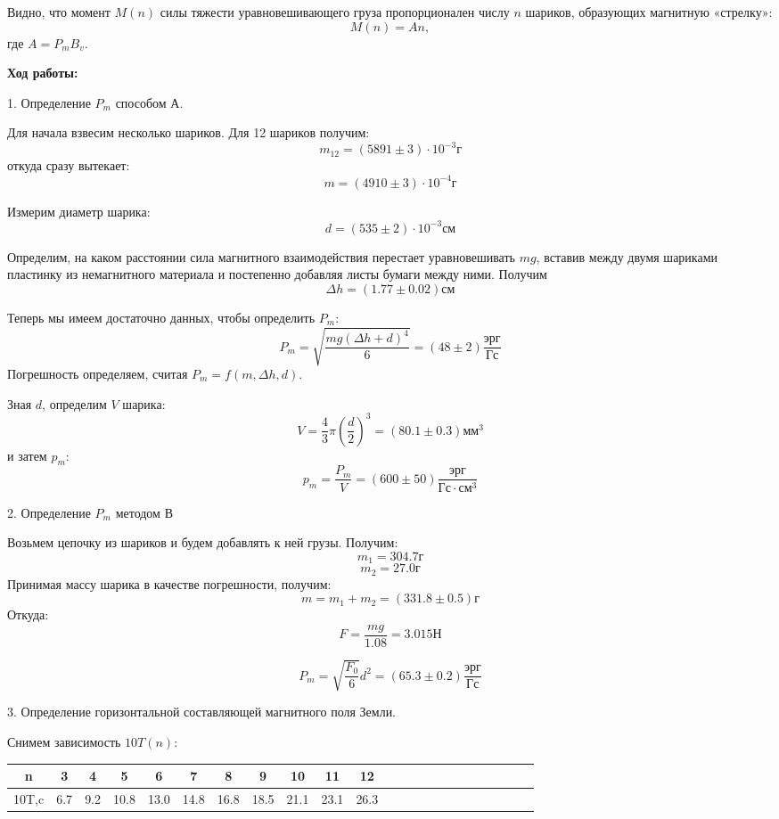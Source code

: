 \documentclass[14pt]{article}
\begin{document}
Видно, что момент $M(n)$ силы тяжести уравновешивающего груза пропорционален числу $n$ шариков, образующих магнитную «стрелку»:
$$
	M(n) = An,
$$
где $A = P_mB_v$.



\newpage
\textbf{Ход работы:}

1. Определение $P_m$ способом А.

Для начала взвесим несколько шариков. Для 12 шариков получим:
$$
	m_{12} = (5891 \pm 3)\cdot10^{-3} \text{г}
$$
откуда сразу вытекает:
$$
	m = (4910 \pm 3)\cdot10^{-4} \text{г}
$$

Измерим диаметр шарика:
$$
	d = (535 \pm 2)\cdot10^{-3} \text{см}
$$

Определим, на каком расстоянии сила магнитного взаимодействия перестает уравновешивать $mg$, вставив между двумя шариками пластинку из немагнитного материала и постепенно добавляя листы бумаги между ними. Получим
$$
	\Delta h = (1.77 \pm 0.02) \text{см}
$$

Теперь мы имеем достаточно данных, чтобы определить $P_m$:
$$
	P_m = \sqrt{\frac{mg(\Delta h + d)^4}{6}} = (48 \pm 2) \frac{\text{эрг}}{\text{Гс}}
$$
Погрешность определяем, считая $P_m = f(m, \Delta h, d)$.

Зная $d$, определим $V$ шарика:
$$
	V = \frac{4}{3}\pi\left(\frac{d}{2}\right)^3 = (80.1 \pm 0.3) \text{мм}^3
$$
и затем $p_m$:
$$
	p_m = \frac{P_m}{V} = (600 \pm 50) \frac{\text{эрг}}{\text{Гс}\cdot\text{см}^3}
$$


2. Определение $P_m$ методом В

Возьмем цепочку из шариков и будем добавлять к ней грузы. Получим:
$$
	m_1 = 304.7 \text{г}
$$
$$
	m_2 = 27.0 \text{г}
$$
Принимая массу шарика в качестве погрешности, получим:
$$
	m = m_1 + m_2 = (331.8 \pm 0.5) \text{г}
$$
Откуда:
$$
	F = \frac{mg}{1.08} = 3.015 \text{Н}
$$

$$
	P_m = \sqrt{\frac{F_0}{6}}d^2 = (65.3 \pm 0.2) \frac{\text{эрг}}{\text{Гс}}
$$

3. Определение горизонтальной составляющей магнитного поля Земли.

Снимем зависимость $10T(n)$:

\begin{center}
\begin{tabular}{|c|c|c|c|c|c|c|c|c|c|c|c|c|c|c|c|c|c|c|c|c|c|c|}
\hline
n		&	3		&	4		&	5		&	6		&	7		&	8		&	9		&	10		&	11		&	12		\\
\hline
10T,c	&	6.7		&	9.2		&	10.8	&	13.0	&	14.8	&	16.8	&	18.5	&	21.1	&	23.1	&	26.3	\\
\hline
\end{tabular}
\end{center}
\end{document}
